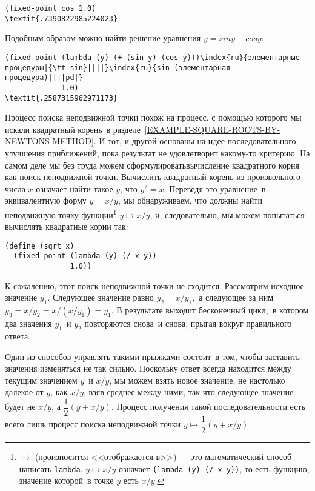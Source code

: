 \begin{Verbatim}[fontsize=\small]
(fixed-point cos 1.0)
\textit{.7390822985224023}
\end{Verbatim}
Подобным образом можно найти решение уравнения $y = sin y +
cos y$:

\begin{Verbatim}[fontsize=\small]
(fixed-point (lambda (y) (+ (sin y) (cos y)))\index{ru}{элементарные процедуры|{\tt sin}||||}\index{ru}{sin (элементарная процедура)||||pd|} 
             1.0)
\textit{.2587315962971173}
\end{Verbatim}

Процесс поиска неподвижной точки похож на процесс,
с помощью которого мы искали квадратный корень~в 
разделе~\ref{EXAMPLE-SQUARE-ROOTS-BY-NEWTONS-METHOD}. И тот, и
другой основаны на идее последовательного улучшения приближений, пока
результат не удовлетворит какому-то критерию.  На самом деле мы без
труда можем сформулироватьвычисление квадратного корня как поиск
неподвижной точки.  Вычислить квадратный корень из произвольного
числа $x$ означает найти такое $y$, что
$y^2 = x$. Переведя это уравнение~в эквивалентную форму
$y = x / y$, мы обнаруживаем, что должны найти
неподвижную точку функции\footnote{
$\mapsto$ (произносится <<отображается
в>>) --- это математический способ написать
{\tt lambda}. $y \mapsto x / y$ означает
{\tt (lambda (y) (/ x y))}, то есть функцию, значение которой~в 
точке $y$ есть $x / y$.
}
$y \mapsto x / y$, и, следовательно, мы можем
попытаться вычислять квадратные корни так:

\begin{Verbatim}[fontsize=\small]
(define (sqrt x)
  (fixed-point (lambda (y) (/ x y))
               1.0))
\end{Verbatim}

К сожалению, этот поиск неподвижной точки не
сходится. Рассмотрим исходное значение $y_1$. Следующее
значение равно $y_2 = x / y_1$,~а следующее за ним
$y_3 = x / y_2 = x / (x / y_1) = y_1$.  В
результате выходит бесконечный цикл,~в котором два значения
$y_1$~и $y_2$ повторяются снова~и снова, прыгая
вокруг правильного ответа.

Один из способов управлять такими прыжками состоит~в том, 
чтобы заставить значения изменяться не так сильно.  Поскольку ответ
всегда находится между текущим значением $y$~и $x
/ y$, мы можем взять новое значение, не настолько далекое от
$y$, как $x / y$, взяв среднее между ними,
так что следующее значение будет не $x / y$, а
$\dfrac{1}{2}(y + x / y)$. Процесс получения такой
последовательности есть всего лишь процесс поиска неподвижной точки
$y \mapsto \dfrac{1}{2} (y + x / y)$.

